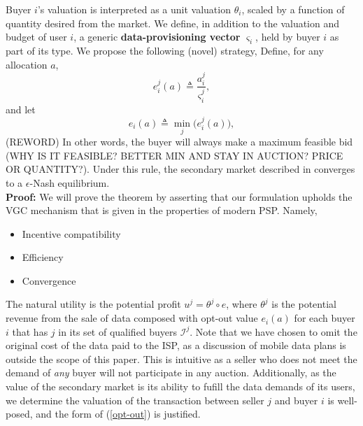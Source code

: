 \documentclass[12pt]{article}
\theoremstyle{definition}
\newcommand{\vs}{\varsigma}
\newcommand{\mcI}{\mathcal{I}}
\begin{document}
\begin{multicols}{2}
Buyer $i$'s valuation is interpreted as a unit valuation $\theta_i$, scaled
by a function of quantity desired from the market. 
We define, in addition to the valuation and budget of user $i$, a generic
\textbf{data-provisioning vector} $\vs_i$, held by buyer $i$ as part of its type. We propose the
following (novel) strategy,
{
\label{strategy}
Define, for any allocation $a$,
\begin{equation}\label{opt-out}
    e_i^j(a) \triangleq \frac{a_i^j}{\vs_i^j},
\end{equation}
and let
\begin{equation}
    e_i(a) \triangleq \min_j\bigg(e_i^j(a)\bigg),
\end{equation}
(REWORD) In other words, the
buyer will always make a maximum feasible bid (WHY IS IT FEASIBLE? BETTER MIN
AND STAY IN AUCTION? PRICE OR QUANTITY?). 
Under this rule, the secondary market described in \cite{zheng} converges to a $\epsilon$-Nash equilibrium.
}\\
\textbf{Proof:}
We will prove the theorem by asserting that our formulation upholds the VGC
mechanism that is given in the properties of modern PSP. Namely,
\begin{itemize}
    \item Incentive compatibility
    \item Efficiency 
    \item Convergence
\end{itemize}

The natural utility is the potential
profit $u^j = \theta^j\circ e$, where $\theta^j$ is the
potential revenue from the sale of data composed with opt-out value
$e_i(a)$ for each buyer $i$ that has $j$ in its set of qualified buyers
$\mcI^j$. Note that we have chosen to omit the original cost of the data
paid to the ISP, as a discussion of mobile data plans is outside the scope of this
paper. This is intuitive as a seller who does not meet the demand of \emph{any} buyer will not
participate in any auction. Additionally, as the
value of the secondary market is its ability to fufill the data demands of its
users, we determine the
valuation of the transaction between seller $j$ and buyer $i$ is well-posed,
and the form of (\ref{opt-out}) is justified. 


\end{multicols}
\end{document}
